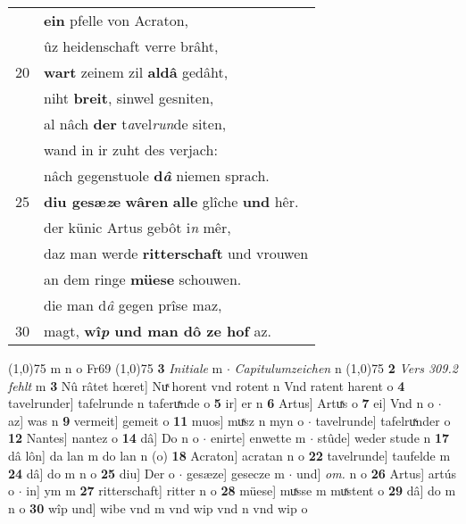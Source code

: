 \documentclass[8pt,a4paper,notitlepage]{article}
\begin{document}
\begin{table}[ht]
\begin{minipage}[t]{0.5\linewidth}
\begin{tabular}{rl}
 & \textbf{ein} pfelle von Acraton,\\ 
 & ûz heidenschaft verre brâht,\\ 
20 & \textbf{wart} zeinem zil \textbf{aldâ} gedâht,\\ 
 & niht \textbf{breit}, sinwel gesniten,\\ 
 & al nâch \textbf{der} t\textit{a}vel\textit{run}de siten,\\ 
 & wand in ir zuht des verjach:\\ 
 & nâch gegenstuole \textbf{d\textit{â}} niemen sprach.\\ 
25 & \textbf{diu gesæ\textit{z}e} \textbf{wâren} \textbf{alle} glîche \textbf{und} hêr.\\ 
 & der künic Artus gebôt i\textit{n} mêr,\\ 
 & daz man werde \textbf{ritterschaft} und vrouwen\\ 
 & an dem ringe \textbf{müese} schouwen.\\ 
 & die man d\textit{â} gegen prîse maz,\\ 
30 & magt, \textbf{wî\textit{p} und man dô ze hof} az.\\ 
\end{tabular}
\scriptsize
\line(1,0){75} \newline
m n o Fr69 \newline
\line(1,0){75} \newline
\textbf{3} \textit{Initiale} m   $\cdot$ \textit{Capitulumzeichen} n  \newline
\line(1,0){75} \newline
\textbf{2} \textit{Vers 309.2 fehlt} m  \textbf{3} Nû râtet hœret] Nuͯ horent vnd rotent n Vnd ratent harent o \textbf{4} tavelrunder] tafelrunde n taferuͯnde o \textbf{5} ir] er n \textbf{6} Artus] Artuͯs o \textbf{7} ei] Vnd n o  $\cdot$ az] was n \textbf{9} vermeit] gemeit o \textbf{11} muos] muͯsz n myn o  $\cdot$ tavelrunde] tafelruͯnder o \textbf{12} Nantes] nantez o \textbf{14} dâ] Do n o  $\cdot$ enirte] enwette m  $\cdot$ stûde] weder stude n \textbf{17} dâ lôn] da lan m do lan n (o) \textbf{18} Acraton] acratan n o \textbf{22} tavelrunde] taufelde m \textbf{24} dâ] do m n o \textbf{25} diu] Der o  $\cdot$ gesæze] gesecze m  $\cdot$ und] \textit{om.} n o \textbf{26} Artus] artús o  $\cdot$ in] ym m \textbf{27} ritterschaft] ritter n o \textbf{28} müese] muͯsse m muͯstent o \textbf{29} dâ] do m n o \textbf{30} wîp und] wibe vnd m vnd wip vnd n vnd wip o \newline
\end{minipage}
\end{table}
\end{document}
